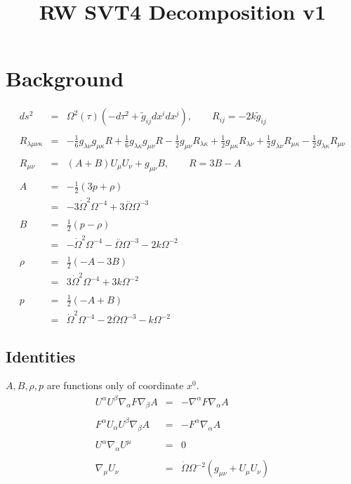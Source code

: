 \documentclass[10pt,letterpaper]{article}
\title{RW SVT4 Decomposition v1}
\date{}
\numberwithin{equation}{section}
\begin{document}
 
\maketitle
\noindent 
\section{Background}
\begin{eqnarray}
ds^2 &=& \Omega^2(\tau)\left(-d\tau^2 +\tilde g_{ij} dx^i dx^j\right),\qquad R_{ij} = -2k \tilde g_{ij}
\label{geom2}
\\ \nonumber\\
R_{\lambda\mu\nu\kappa} &=&- \tfrac{1}{6} g_{\lambda \nu } g_{\mu \kappa } R + \tfrac{1}{6} g_{\lambda \kappa } g_{\mu \nu } R -  \tfrac{1}{2} g_{\mu \nu } R_{\lambda \kappa } + \tfrac{1}{2} g_{\mu \kappa } R_{\lambda \nu } + \tfrac{1}{2} g_{\lambda \nu } R_{\mu \kappa } -  \tfrac{1}{2} g_{\lambda \kappa } R_{\mu \nu }
\\ \nonumber\\
R_{\mu\nu} &=& (A+B)U_\mu U_\nu + g_{\mu\nu}B,\qquad R=3B-A
\label{Ricci}
\\ \nonumber\\
A &=& -\tfrac12 (3p+\rho)
\nonumber\\
&=& -3 \dot{\Omega}^2 \Omega^{-4} + 3 \overset{..}{\Omega} \Omega^{-3}
\\ \nonumber\\
B&=& \tfrac12(p-\rho)
\nonumber\\
&=& - \dot{\Omega}^2 \Omega^{-4} -  \overset{..}{\Omega} \Omega^{-3} - 2 k \Omega^{-2}
\\ \nonumber\\
\rho &=& \tfrac{1}{2} (- A - 3 B)
\nonumber\\
&=& 3 \dot{\Omega}^2 \Omega^{-4} + 3 k \Omega^{-2}
\\ \nonumber\\
p &=& \tfrac{1}{2} (- A + B)
\nonumber\\
&=& \dot{\Omega}^2 \Omega^{-4} - 2 \overset{..}{\Omega} \Omega^{-3} -  k \Omega^{-2}
\end{eqnarray}
%
%
\subsection{Identities}
$A, B, \rho, p$ are functions only of coordinate $x^0$. 
\begin{eqnarray}
U^\alpha U^\beta \nabla_\alpha F\nabla_\beta A &=& -\nabla^\alpha F \nabla_\alpha A
\\ \nonumber\\
F^\alpha U_\alpha U^\beta \nabla_\beta A &=& -F^\alpha \nabla_\alpha A
\\ \nonumber\\
U^\alpha\nabla_\alpha U^\mu &=& 0
\\ \nonumber\\
\nabla_\mu U_\nu &=& \dot\Omega \Omega^{-2}(g_{\mu\nu} + U_{\mu}U_\nu)
\end{eqnarray}
%
%
\newpage
\end{document}
